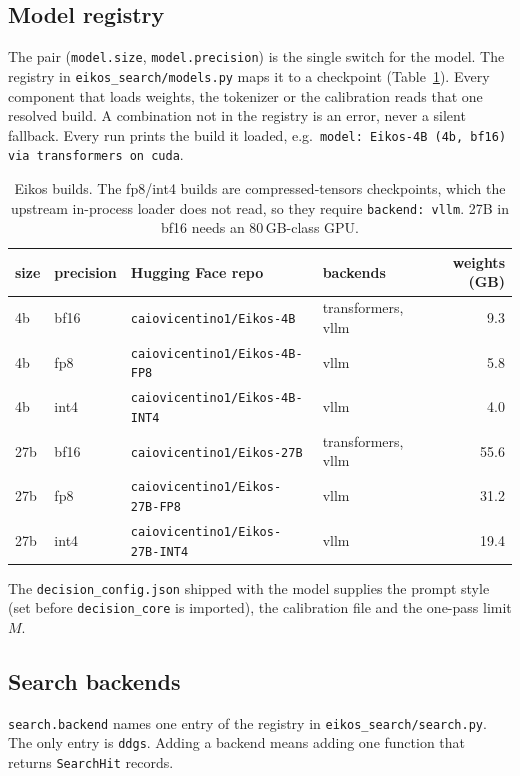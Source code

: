 \documentclass[11pt,a4paper]{article}
\newcommand{\code}[1]{\texttt{#1}}
\begin{document}
\subsection{Model registry}

The pair (\code{model.size}, \code{model.precision}) is the single switch for the model. The registry in
\code{eikos\_search/models.py} maps it to a checkpoint (Table~\ref{tab:models}). Every component that loads weights,
the tokenizer or the calibration reads that one resolved build. A combination not in the registry is an error, never a
silent fallback. Every run prints the build it loaded, e.g.\ \code{model: Eikos-4B (4b, bf16) via transformers on
cuda}.

\begin{table}[htbp]
\centering
\caption{Eikos builds. The fp8/int4 builds are compressed-tensors checkpoints, which the upstream in-process loader
does not read, so they require \code{backend: vllm}. 27B in bf16 needs an 80\,GB-class GPU.}
\label{tab:models}
\begin{tabular}{llllr}
\toprule
size & precision & Hugging Face repo & backends & weights (GB) \\
\midrule
4b  & bf16 & \code{caiovicentino1/Eikos-4B}       & transformers, vllm & 9.3 \\
4b  & fp8  & \code{caiovicentino1/Eikos-4B-FP8}   & vllm & 5.8 \\
4b  & int4 & \code{caiovicentino1/Eikos-4B-INT4}  & vllm & 4.0 \\
27b & bf16 & \code{caiovicentino1/Eikos-27B}      & transformers, vllm & 55.6 \\
27b & fp8  & \code{caiovicentino1/Eikos-27B-FP8}  & vllm & 31.2 \\
27b & int4 & \code{caiovicentino1/Eikos-27B-INT4} & vllm & 19.4 \\
\bottomrule
\end{tabular}
\end{table}

The \code{decision\_config.json} shipped with the model supplies the prompt style (set before \code{decision\_core} is
imported), the calibration file and the one-pass limit $M$.

\subsection{Search backends}

\code{search.backend} names one entry of the registry in \code{eikos\_search/search.py}. The only entry is
\code{ddgs}. Adding a backend means adding one function that returns \code{SearchHit} records.
\end{document}
